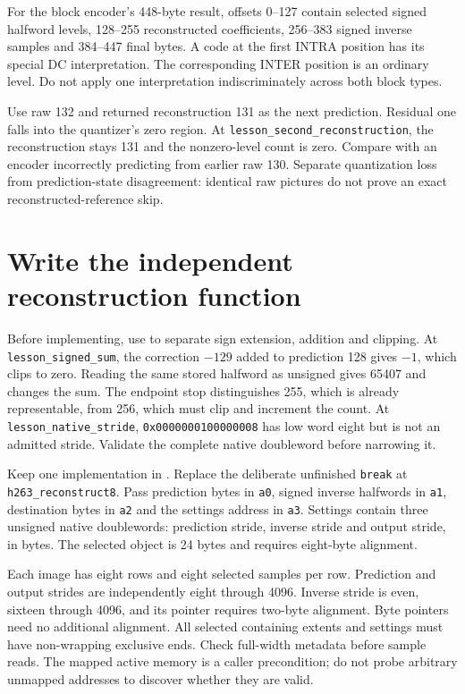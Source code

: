 For the block encoder's 448-byte result, offsets 0--127 contain selected signed
halfword levels, 128--255 reconstructed coefficients, 256--383 signed inverse
samples and 384--447 final bytes. A code at the first INTRA position has its
special DC interpretation. The corresponding INTER position is an ordinary level.
Do not apply one interpretation indiscriminately across both block types.

Use raw 132 and returned reconstruction 131 as the next prediction. Residual
one falls into the quantizer's zero region. At
\texttt{lesson\_second\_reconstruction}, the reconstruction stays 131 and the
nonzero-level count is zero. Compare with an encoder incorrectly predicting from
earlier raw 130. Separate quantization loss from prediction-state disagreement:
identical raw pictures do not prove an exact reconstructed-reference skip.

\section{Write the independent reconstruction function}

Before implementing, use  to separate
sign extension, addition and clipping. At \texttt{lesson\_signed\_sum}, the
correction $-129$ added to prediction 128 gives $-1$, which clips to zero.
Reading the same stored halfword as unsigned gives 65407 and changes the sum.
The endpoint stop distinguishes 255, which is already representable, from 256,
which must clip and increment the count. At \texttt{lesson\_native\_stride},
\texttt{0x0000000100000008} has low word eight but is not an admitted stride.
Validate the complete native doubleword before narrowing it.

Keep one implementation in .
Replace the deliberate unfinished \texttt{break} at
\texttt{h263\_reconstruct8}. Pass prediction bytes in \texttt{a0}, signed
inverse halfwords in \texttt{a1}, destination bytes in \texttt{a2} and the
settings address in \texttt{a3}. Settings contain three unsigned native
doublewords: prediction stride, inverse stride and output stride, in bytes.
The selected object is 24 bytes and requires eight-byte alignment.

Each image has eight rows and eight selected samples per row. Prediction and
output strides are independently eight through 4096. Inverse stride is even,
sixteen through 4096, and its pointer requires two-byte alignment. Byte pointers
need no additional alignment. All selected containing extents and settings must
have non-wrapping exclusive ends. Check full-width metadata before sample reads.
The mapped active memory is a caller precondition; do not probe arbitrary
unmapped addresses to discover whether they are valid.

